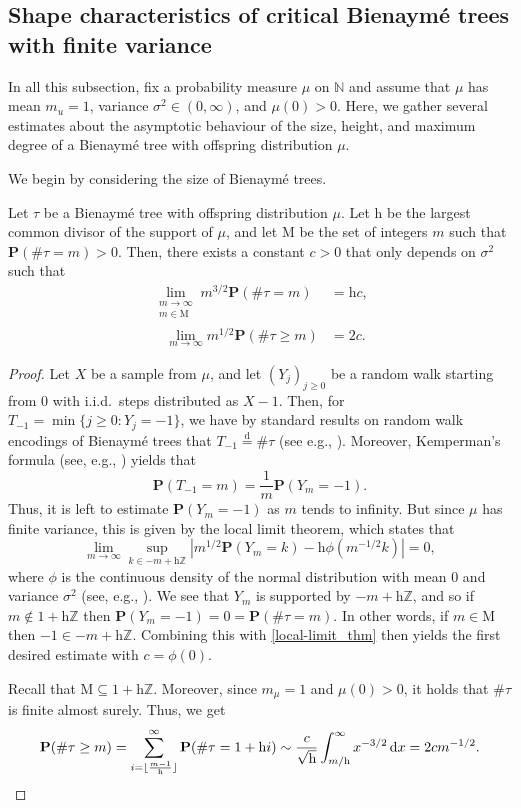 \documentclass[11pt,reqno]{amsart}
\newcommand{\N}{\mathbb{N}}
\renewcommand{\P}{\mathbf{P}}
\newcommand{\Z}{\mathbb{Z}}
\newcommand{\1}{\mathbf{1}}
\newcommand{\0}{\mathbf{0}}
\newcommand{\eqdist}{\ensuremath{\stackrel{\mathrm{d}}{=}}}
\begin{document}
\subsection{Shape characteristics of critical Bienaym\'{e} trees with finite variance}

In all this subsection, fix a probability measure $\mu$ on $\N$ and assume that $\mu$ has mean $m_u=1$, variance $\sigma^2\in (0,\infty)$, and $\mu(0)>0$. Here, we gather several estimates about the asymptotic behaviour of the size, height, and maximum degree of a Bienaymé tree with offspring distribution $\mu$.

We begin by considering the size of Bienaymé trees.

\begin{prop}\label{single_tree_size} 
   Let $\tau$ be a Bienaymé tree with offspring distribution $\mu$. Let $\mathrm{h}$ be the largest common divisor of the support of $\mu$, and let $\mathrm{M}$ be the set of integers $m$ such that $\P(\#\tau=m)>0$. Then, there exists a constant $c> 0$ that only depends on $\sigma^2$ such that
   \begin{align*}
   \lim_{\substack{m\to\infty \\ m\in \mathrm{M}}} m^{3/2}\P(\#\tau=m)&=\mathrm{h}c,\\
   \quad \lim_{m\to\infty}m^{1/2}\P(\#\tau\geq m)&= 2c.
   \end{align*}
\end{prop}
\begin{proof}
Let $X$ be a sample from $\mu$, and let $(Y_j)_{j\ge 0}$ be a random walk starting from $0$ with i.i.d.~steps distributed as $X-1$. Then, for $T_{-1}=\min\{j\geq 0:Y_j=-1\}$, we have by standard results on random walk encodings of Bienaymé trees that $T_{-1}\eqdist \#\tau$ (see e.g., \cite[Corollary~1.6]{legall2005random}). Moreover, Kemperman's formula (see, e.g., \cite{van2008elementary}) yields that 
\[\P(T_{-1}=m )=\frac{1}{m}\P(Y_m=-1).\]
Thus, it is left to estimate $\P(Y_m=-1)$ as $m$ tends to infinity. But since $\mu$ has finite variance, this is given by the local limit theorem, which states that
\begin{equation}
\label{local-limit_thm}
\lim_{m\to \infty}  \sup_{k\in -m+\mathrm{h}\Z}\left|m^{1/2}\P(Y_m=k)-\mathrm{h}\phi(m^{-1/2}k)\right|=0,
\end{equation}
where $\phi$ is the continuous density of the normal distribution with mean $0$ and variance $\sigma^2$ (see, e.g., \cite[Chapter 7]{petrov2012sums}). We see that $Y_m$ is supported by $-m+\mathrm{h}\Z$, and so if $m\notin 1+\mathrm{h}\Z$ then $\P(Y_m=-1)=0=\P(\#\tau=m)$. In other words, if $m\in\mathrm{M}$ then $-1\in -m+\mathrm{h}\Z$. Combining this with \eqref{local-limit_thm} then yields the first desired estimate with $c=\phi(0)$.

Recall that $\mathrm{M}\subseteq 1+\mathrm{h}\Z$. Moreover, since $m_\mu = 1$ and $\mu(0)>0$, it holds that $\#\tau$ is finite almost surely. Thus, we get
\[\P(\#\tau\geq m)=\sum_{i=\lfloor \frac{m-1}{\mathrm{h}}\rfloor}^\infty \P(\#\tau=1+\mathrm{h}i)\sim \frac{c}{\sqrt{\mathrm{h}}}\int_{m/\mathrm{h}}^\infty x^{-3/2}\, \mathrm{d} x=2c m^{-1/2}.\qedhere\]
\end{proof}
\end{document}
